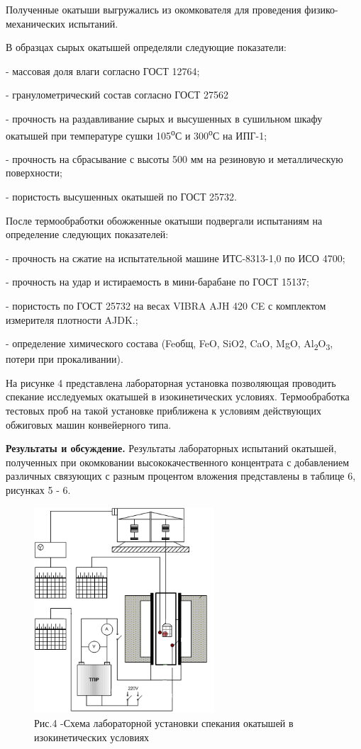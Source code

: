\begin{multicols}{2}
Полученные окатыши выгружались из окомкователя для проведения
физико-механических испытаний.

В образцах сырых окатышей определяли следующие показатели:

- массовая доля влаги согласно ГОСТ 12764;

- гранулометрический состав согласно ГОСТ 27562

- прочность на раздавливание сырых и высушенных в сушильном шкафу
окатышей при температуре сушки 105\textsuperscript{о}С и
300\textsuperscript{о}С на ИПГ-1;

- прочность на сбрасывание с высоты 500 мм на резиновую и металлическую
поверхности;

- пористость высушенных окатышей по ГОСТ 25732.

После термообработки обожженные окатыши подвергали испытаниям на
определение следующих показателей:

- прочность на сжатие на испытательной машине ИТС-8313-1,0 по ИСО 4700;

- прочность на удар и истираемость в мини-барабане по ГОСТ 15137;

- пористость по ГОСТ 25732 на весах VIBRA AJH 420 CE с комплектом
измерителя плотности AJDK.;

- определение химического состава (Feобщ, FeO, SiO2, CaO, MgO,
Al\textsubscript{2}O\textsubscript{3}, потери при прокаливании).

На рисунке 4 представлена лабораторная установка позволяющая проводить
спекание исследуемых окатышей в изокинетических условиях. Термообработка
тестовых проб на такой установке приближена к условиям действующих
обжиговых машин конвейерного типа.

{\bfseries Результаты и обсуждение.} Результаты лабораторных испытаний
окатышей, полученных при окомковании высококачественного концентрата с
добавлением различных связующих с разным процентом вложения представлены
в таблице 6, рисунках 5 - 6.
\end{multicols}

\begin{figure}[H]
	\centering
	\includegraphics[width=0.6\textwidth,height=0.5\textwidth]{media/chem2/image65}
	\caption*{Рис.4 -Схема лабораторной установки спекания окатышей в изокинетических условиях}
\end{figure}

